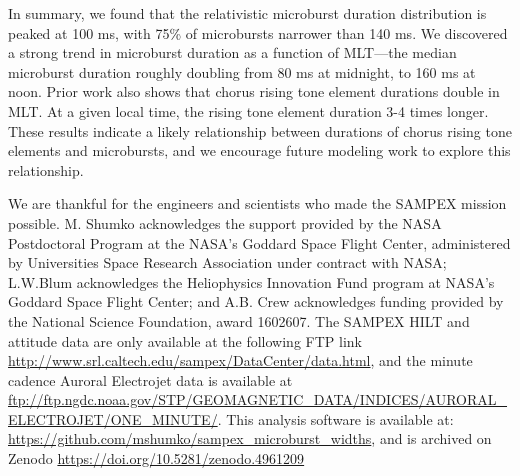 \documentclass[draft]{agujournal2019}
\begin{document}
In summary, we found that the relativistic microburst duration distribution is peaked at 100 ms, with 75\% of microbursts narrower than 140 ms. We discovered a strong trend in microburst duration as a function of MLT---the median microburst duration roughly doubling from 80 ms at midnight, to 160 ms at noon. Prior work also shows that chorus rising tone element durations double in MLT. At a given local time, the rising tone element duration 3-4 times longer. These results indicate a likely relationship between durations of chorus rising tone elements and microbursts, and we encourage future modeling work to explore this relationship.


%
%
%
%

\acknowledgments
We are thankful for the engineers and scientists who made the SAMPEX mission possible. M. Shumko acknowledges the support provided by the NASA Postdoctoral Program at the NASA’s Goddard Space Flight Center, administered by Universities Space Research Association under contract with NASA; L.W.Blum acknowledges the Heliophysics Innovation Fund program at NASA’s Goddard Space Flight Center; and A.B. Crew acknowledges funding provided by the National Science Foundation, award 1602607. The SAMPEX HILT and attitude data are only available at the following FTP link \url{http://www.srl.caltech.edu/sampex/DataCenter/data.html}, and the minute cadence Auroral Electrojet data is available at \url{ftp://ftp.ngdc.noaa.gov/STP/GEOMAGNETIC_DATA/INDICES/AURORAL_ELECTROJET/ONE_MINUTE/}.
This analysis software is available at: \url{https://github.com/mshumko/sampex_microburst_widths}, and is archived on Zenodo \url{https://doi.org/10.5281/zenodo.4961209}



%
%
\end{document}
